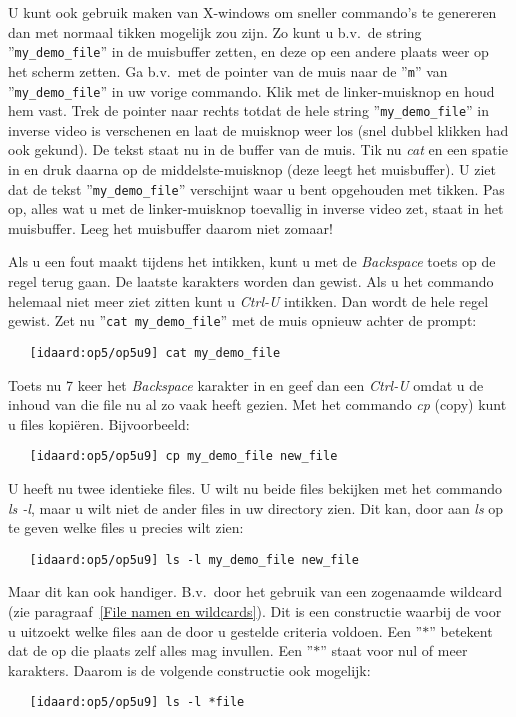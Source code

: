 U kunt ook gebruik maken van X-windows om sneller commando's te genereren
dan met normaal tikken mogelijk zou zijn.
Zo kunt u b.v.\ de string ''{\tt my\_demo\_file}'' in de muisbuffer zetten,
en deze op een andere plaats weer op het scherm zetten.
Ga b.v.\ met de pointer van de muis naar
de ''{\tt m}'' van ''{\tt my\_demo\_file}'' in uw vorige commando.
Klik met de linker-muisknop en houd hem vast.
Trek de pointer naar rechts totdat de
hele string ''{\tt my\_demo\_file}'' in inverse video is verschenen
en laat de muisknop weer los (snel dubbel klikken had ook gekund).
De tekst staat nu in de buffer van de muis.
Tik nu {\em cat} en een spatie in en
druk daarna op de middelste-muisknop (deze leegt het muisbuffer).
U ziet dat de tekst ''{\tt my\_demo\_file}'' verschijnt
waar u bent opgehouden met tikken.
Pas op,
alles wat u met de linker-muisknop toevallig in inverse video zet,
staat in het muisbuffer.
Leeg het muisbuffer daarom niet zomaar!

Als u een fout maakt tijdens het intikken,
kunt u met de {\em Backspace} toets op de regel terug gaan.
De laatste karakters worden dan gewist.
Als u het commando helemaal niet meer ziet zitten
kunt u {\em Ctrl-U} intikken.
Dan wordt de hele regel gewist.
Zet nu ''{\tt cat my\_demo\_file}'' met de muis opnieuw achter de prompt:
\begin{verbatim}
   [idaard:op5/op5u9] cat my_demo_file
\end{verbatim}

Toets nu 7 keer het {\em Backspace} karakter in
en geef dan een {\em Ctrl-U}
omdat u de inhoud van die file nu al zo vaak heeft gezien.
Met het commando {\em cp} (copy) kunt u files kopi\"eren.
Bijvoorbeeld:
\begin{verbatim}
   [idaard:op5/op5u9] cp my_demo_file new_file
\end{verbatim}

U heeft nu twee identieke files.
U wilt nu beide files bekijken met het commando {\em ls -l},
maar u wilt niet de ander files in uw directory zien.
Dit kan,
door aan {\em ls} op te geven welke files u precies wilt zien:
\begin{verbatim}
   [idaard:op5/op5u9] ls -l my_demo_file new_file
\end{verbatim}

Maar dit kan ook handiger.
B.v.\ door het gebruik van een zogenaamde wildcard
(zie paragraaf~\ref{File namen en wildcards}).
Dit is een constructie waarbij de  voor u uitzoekt
welke files aan de door u gestelde criteria voldoen.
Een ''{\tt $\ast$}'' betekent dat de 
op die plaats zelf alles mag invullen.
Een ''{\tt $\ast$}'' staat voor nul of meer karakters.
Daarom is de volgende constructie ook mogelijk:
\begin{verbatim}
   [idaard:op5/op5u9] ls -l *file
\end{verbatim}

